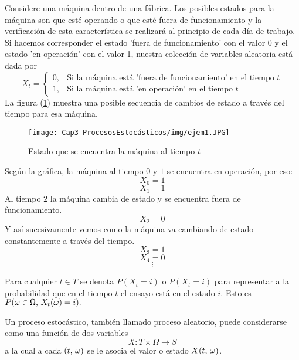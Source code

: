 \begin{Ejm}
    Considere una máquina dentro de una fábrica. Los
    posibles estados para la máquina son que esté operando o que esté fuera de funcionamiento
    y la verificación de esta característica se realizará al principio de cada día de trabajo. Si
    hacemos corresponder el estado 'fuera de funcionamiento' con el valor 0 y el estado 'en operación' con el valor 1, nuestra colección de variables aleatoria está dada por 
    $$X_t=
    \label{ejm-procEstocástico}
    \begin{cases}
        0, & \mbox{Si la máquina está 'fuera de funcionamiento' en el tiempo $t$}\\
        1, & \mbox{Si la máquina está 'en operación' en el tiempo $t$}
    \end{cases}$$
    La figura (\ref{fig-procesoEstocástico-Ejemplo}) muestra una posible secuencia de cambios de estado a través del tiempo para esa máquina.
    \begin{center}
        \begin{figure}[htb]
            \begin{center}
             \texttt{[image: Cap3-ProcesosEstocásticos/img/ejem1.JPG]}
                \vspace*{0.05in}
            \end{center}
            \caption{Estado que se encuentra la máquina al tiempo $t$ }
            \label{fig-procesoEstocástico-Ejemplo}
        \end{figure}
    \end{center}
    Según la gráfica, la máquina al tiempo $0$ y $1$ se encuentra en operación, por eso:
    $$X_0=1$$
    $$X_1=1$$
    Al tiempo $2$ la máquina cambia de estado y se encuentra fuera de funcionamiento. 
    $$X_2=0$$
    Y así sucesivamente vemos como la máquina va cambiando de estado constantemente a través del tiempo.
    $$X_3=1$$
    $$X_4=0$$
    $$\vdots$$
\end{Ejm}
\begin{Obs}
Para cualquier $t\in T$ se denota $P(X_t=i)$ o $P(X_t=i)$ para representar a la probabilidad que en el tiempo $t$ el ensayo está en el estado $i$. Esto es  $P(\omega\in\Omega,\thinspace X_t(\omega)=i).$
\end{Obs}
Un proceso estocástico, también llamado proceso aleatorio, puede considerarse como una función de dos variables
$$X:T\times\Omega\rightarrow S$$ a la cual a cada $(t,\thinspace\omega)$ se le asocia el valor o estado $X (t,\thinspace\omega) $.\\
